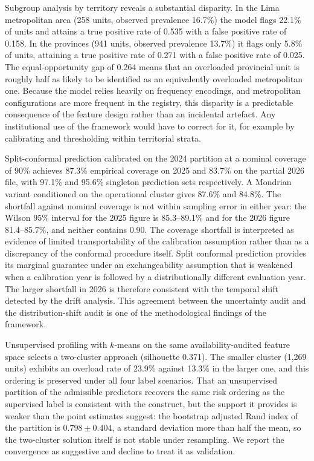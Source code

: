 \documentclass[sn-vancouver,Numbered]{sn-jnl}
\begin{document}
Subgroup analysis by territory reveals a substantial disparity. In the Lima metropolitan area (258 units, observed prevalence 16.7\%) the model flags 22.1\% of units and attains a true positive rate of 0.535 with a false positive rate of 0.158. In the provinces (941 units, observed prevalence 13.7\%) it flags only 5.8\% of units, attaining a true positive rate of 0.271 with a false positive rate of 0.025. The equal-opportunity gap of 0.264 means that an overloaded provincial unit is roughly half as likely to be identified as an equivalently overloaded metropolitan one. Because the model relies heavily on frequency encodings, and metropolitan configurations are more frequent in the registry, this disparity is a predictable consequence of the feature design rather than an incidental artefact. Any institutional use of the framework would have to correct for it, for example by calibrating and thresholding within territorial strata.

Split-conformal prediction \cite{vovk_algorithmic_2005} calibrated on the 2024 partition at a nominal coverage of 90\% achieves 87.3\% empirical coverage on 2025 and 83.7\% on the partial 2026 file, with 97.1\% and 95.6\% singleton prediction sets respectively. A Mondrian variant conditioned on the operational cluster gives 87.6\% and 84.8\%. The shortfall against nominal coverage is not within sampling error in either year: the Wilson 95\% interval for the 2025 figure is 85.3--89.1\% and for the 2026 figure 81.4--85.7\%, and neither contains 0.90. The coverage shortfall is interpreted as evidence of limited transportability of the calibration assumption rather than as a discrepancy of the conformal procedure itself. Split conformal prediction provides its marginal guarantee under an exchangeability assumption that is weakened when a calibration year is followed by a distributionally different evaluation year. The larger shortfall in 2026 is therefore consistent with the temporal shift detected by the drift analysis. This agreement between the uncertainty audit and the distribution-shift audit is one of the methodological findings of the framework.

Unsupervised profiling with $k$-means on the same availability-audited feature space selects a two-cluster approach (silhouette 0.371). The smaller cluster (1{,}269 units) exhibits an overload rate of 23.9\% against 13.3\% in the larger one, and this ordering is preserved under all four label scenarios. That an unsupervised partition of the admissible predictors recovers the same risk ordering as the supervised label is consistent with the construct, but the support it provides is weaker than the point estimates suggest: the bootstrap adjusted Rand index of the partition is $0.798 \pm 0.404$, a standard deviation more than half the mean, so the two-cluster solution itself is not stable under resampling. We report the convergence as suggestive and decline to treat it as validation.
\end{document}
